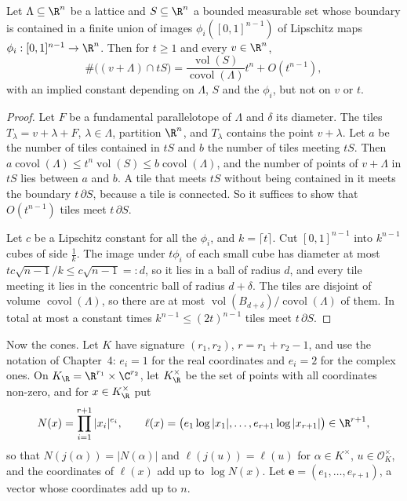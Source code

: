 \begin{lemma}\label{lem:lipschitz}
Let $\Lambda\subseteq\R^n$ be a lattice and $S\subseteq\R^n$ a bounded measurable set whose boundary is contained in a finite
union of images $\phi_i([0,1]^{n-1})$ of Lipschitz maps $\phi_i:[0,1]^{n-1}\to\R^n$. Then for $t\ge1$ and every $v\in\R^n$,
\[
\#\bigl((v+\Lambda)\cap tS\bigr)=\frac{\operatorname{vol}(S)}{\operatorname{covol}(\Lambda)}t^n+O(t^{n-1}),
\]
with an implied constant depending on $\Lambda$, $S$ and the $\phi_i$, but not on $v$ or $t$.
\end{lemma}
\begin{proof}
Let $F$ be a fundamental parallelotope of $\Lambda$ and $\delta$ its diameter. The tiles $T_\lambda=v+\lambda+F$, $\lambda\in\Lambda$,
partition $\R^n$, and $T_\lambda$ contains the point $v+\lambda$. Let $a$ be the number of tiles contained in $tS$ and $b$ the
number of tiles meeting $tS$. Then $a\operatorname{covol}(\Lambda)\le t^n\operatorname{vol}(S)\le b\operatorname{covol}(\Lambda)$,
and the number of points of $v+\Lambda$ in $tS$ lies between $a$ and $b$. A tile that meets $tS$ without being contained in it
meets the boundary $t\,\partial S$, because a tile is connected. So it suffices to show that $O(t^{n-1})$ tiles meet $t\,\partial S$.

Let $c$ be a Lipschitz constant for all the $\phi_i$, and $k=\lceil t\rceil$. Cut $[0,1]^{n-1}$ into $k^{n-1}$ cubes of side $\frac1k$.
The image under $t\phi_i$ of each small cube has diameter at most $tc\sqrt{n-1}/k\le c\sqrt{n-1}=:d$, so it lies in a ball of
radius $d$, and every tile meeting it lies in the concentric ball of radius $d+\delta$. The tiles are disjoint of volume
$\operatorname{covol}(\Lambda)$, so there are at most $\operatorname{vol}(B_{d+\delta})/\operatorname{covol}(\Lambda)$ of them. In
total at most a constant times $k^{n-1}\le(2t)^{n-1}$ tiles meet $t\,\partial S$.
\end{proof}

Now the cones. Let $K$ have signature $(r_1,r_2)$, $r=r_1+r_2-1$, and use the notation of Chapter~4: $e_i=1$ for the real
coordinates and $e_i=2$ for the complex ones. On $K_\R=\R^{r_1}\times\C^{r_2}$, let $K_\R^\times$ be the set of points with all
coordinates non-zero, and for $x\in K_\R^\times$ put
\[
N(x)=\prod_{i=1}^{r+1}|x_i|^{e_i},\qquad \ell(x)=\bigl(e_1\log|x_1|,\dots,e_{r+1}\log|x_{r+1}|\bigr)\in\R^{r+1},
\]
so that $N(j(\alpha))=|N(\alpha)|$ and $\ell(j(u))=\ell(u)$ for $\alpha\in K^\times$, $u\in\mathcal O_K^\times$, and the coordinates of
$\ell(x)$ add up to $\log N(x)$. Let $\mathbf e=(e_1,\dots,e_{r+1})$, a vector whose coordinates add up to $n$.


